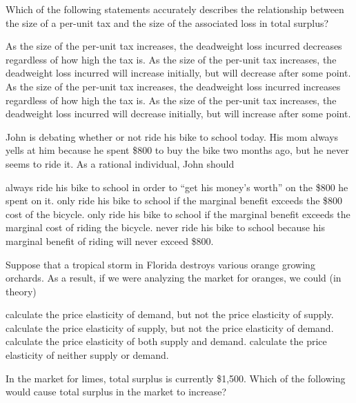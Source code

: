 \documentclass[addpoints,11pt]{exam}
\theoremstyle{definition}
\begin{document}
\begin{questions}
\question Which of the following statements accurately describes the relationship between the size of a per-unit tax and the size of the associated loss in total surplus?

\begin{choices}
	\choice As the size of the per-unit tax increases, the deadweight loss incurred decreases regardless of how high the tax is.
	\choice As the size of the per-unit tax increases, the deadweight loss incurred will increase initially, but will decrease after some point.
	\CorrectChoice As the size of the per-unit tax increases, the deadweight loss incurred increases regardless of how high the tax is.
	\choice As the size of the per-unit tax increases, the deadweight loss incurred will decrease initially, but will increase after some point.
\end{choices}

\question John is debating whether or not ride his bike to school today. His mom always yells at him because he spent \$800 to buy the bike two months ago, but he never seems to ride it. As a rational individual, John should

\begin{choices}
	\choice always ride his bike to school in order to ``get his money's worth'' on the \$800 he spent on it.
	\choice only ride his bike to school if the marginal benefit exceeds the \$800
	 cost of the bicycle.
	\CorrectChoice only ride his bike to school if the marginal benefit exceeds the marginal cost of riding the bicycle.
	\choice never ride his bike to school because his marginal benefit of riding will never exceed \$800.
\end{choices}

\question Suppose that a tropical storm in Florida destroys various orange growing orchards. As a result, if we were analyzing the market for oranges, we could (in theory)

\begin{choices}
	\CorrectChoice calculate the price elasticity of demand, but not the price elasticity of supply.
	\choice calculate the price elasticity of supply, but not the price elasticity of demand.
	\choice calculate the price elasticity of both supply and demand.
	\choice calculate the price elasticity of neither supply or demand.
\end{choices}

\question In the market for limes, total surplus is currently \$1,500. Which of the following would cause total surplus in the market to increase?


\end{questions}
\end{document}
